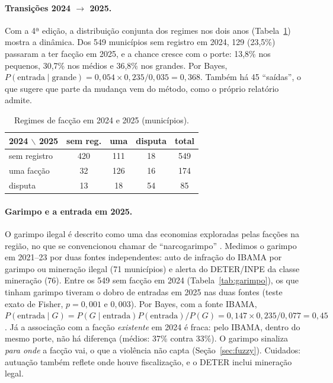 \documentclass[10pt,a4paper,twocolumn]{article}
\begin{document}
\paragraph{Transições 2024 $\to$ 2025.} Com a 4ª edição, a distribuição conjunta dos regimes
nos dois anos (Tabela~\ref{tab:trans}) mostra a dinâmica. Dos 549 municípios sem registro em
2024, 129 (23,5\%) passaram a ter facção em 2025, e a chance cresce com o porte: 13,8\% nos
pequenos, 30,7\% nos médios e 36,8\% nos grandes. Por Bayes,
$P(\text{entrada}\mid\text{grande})=0{,}054\times0{,}235/0{,}035=0{,}368$. Também há 45
``saídas'', o que sugere que parte da mudança vem do método, como o próprio relatório
admite.

\begin{table}[t]
\centering\small
\begin{tabular}{@{}lcccc@{}}
\toprule
2024 $\backslash$ 2025 & sem reg. & uma & disputa & total\\
\midrule
sem registro & 420 & 111 & 18 & 549\\
uma facção & 32 & 126 & 16 & 174\\
disputa & 13 & 18 & 54 & 85\\
\bottomrule
\end{tabular}
\caption{Regimes de facção em 2024 e 2025 (municípios).}\label{tab:trans}
\end{table}

\paragraph{Garimpo e a entrada em 2025.} O garimpo ilegal é descrito como uma das economias
exploradas pelas facções na região, no que se convencionou chamar de ``narcogarimpo''
\cite{r13,r14}. Medimos o garimpo em 2021--23 por duas fontes independentes: auto de
infração do IBAMA por garimpo ou mineração ilegal (71 municípios) e alerta do DETER/INPE da
classe mineração (76). Entre os 549 sem facção em 2024 (Tabela~\ref{tab:garimpo}), os que
tinham garimpo tiveram o dobro de entradas em 2025 nas duas fontes (teste exato de Fisher,
$p=0{,}001$ e $0{,}003$). Por Bayes, com a fonte IBAMA,
$P(\text{entrada}\mid G)=P(G\mid\text{entrada})P(\text{entrada})/P(G)=0{,}147\times0{,}235/0{,}077=0{,}45$.
Já a associação com a facção \emph{existente} em 2024 é fraca: pelo IBAMA, dentro do mesmo
porte, não há diferença (médios: 37\% contra 33\%). O garimpo sinaliza \emph{para onde} a
facção vai, o que a violência não capta (Seção~\ref{sec:fuzzy}). Cuidados: autuação também
reflete onde houve fiscalização, e o DETER inclui mineração legal.
\end{document}
